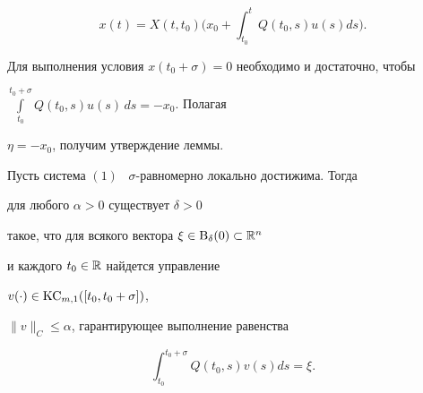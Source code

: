 $$


x(t)=X(t,t_0)\Big(x_0+\int_{t_0}^t Q(t_0,s)u(s)ds\Big).


$$


Для выполнения условия $x(t_0+\sigma)=0$ необходимо и достаточно, чтобы


$\int\limits_{t_0}^{t_0+\sigma}Q(t_0,s)u(s)\,ds=-x_0$. Полагая


$\eta=-x_0$, получим утверждение леммы.





\begin{lem}


Пусть система $(1)$ \ $\sigma$-равномерно локально достижима. Тогда


для любого $\alpha>0$ существует $\delta>0$


такое, что для всякого вектора $\xi\in\mathrm B_{\delta}(0)\subset\Bbb R^n$


и каждого $t_0\in\Bbb R$ найдется управление


$v(\cdot)\in\mathrm{KC}_{m,1}([t_0,t_0+\sigma])$,


$\|v\|_C\le\alpha$, гарантирующее выполнение равенства


\begin{equation}


\int_{t_0}^{t_0+\sigma}Q(t_0,s)v(s)ds=\xi.


\end{equation}


\end{lem}





